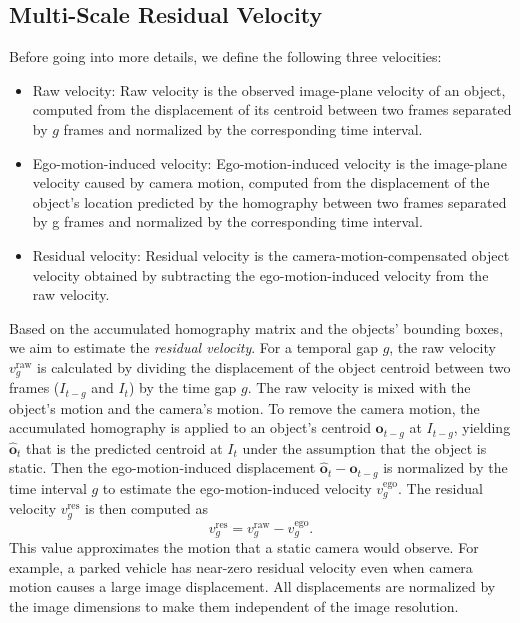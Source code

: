 \documentclass{article}
\begin{document}
\subsection{Multi-Scale Residual Velocity}
\label{sec:residual}
Before going into more details, we define the following three velocities: 
\begin{itemize}
\item Raw velocity: Raw velocity is the observed image-plane velocity of an object, computed from the displacement of its centroid between two frames separated by $g$ frames and normalized by the corresponding time interval. 
\item Ego-motion-induced velocity: Ego-motion-induced velocity is the image-plane velocity caused by camera motion, computed from the displacement of the object's location predicted by the homography between two frames separated by g frames and normalized by the corresponding time interval. 
\item Residual velocity: Residual velocity is the camera-motion-compensated object velocity obtained by subtracting the ego-motion-induced velocity from the raw velocity.
\end{itemize}

Based on the accumulated homography matrix and the objects' bounding boxes, we aim to estimate the \emph{residual velocity}. For a temporal gap $g$, the raw velocity $v^{\mathrm{raw}}_{g}$ is calculated by dividing the displacement of the object centroid between two frames ($I_{t-g}$ and $I_{t}$) by the time gap $g$. The raw velocity is mixed with the object's motion and the camera's motion. To remove the camera motion, the accumulated homography is applied to an object's centroid $\boldsymbol{o}_{t-g}$ at $I_{t-g}$, yielding $\hat{\boldsymbol{o}}_{t}$ that is the predicted centroid at $I_{t}$ under the assumption that the object is static. Then the ego-motion-induced displacement $\hat{\boldsymbol{o}}_{t}-\boldsymbol{o}_{t-g}$ is normalized by the time interval $g$ to estimate the ego-motion-induced velocity $v^{\mathrm{ego}}_{g}$. The residual velocity $v^{\mathrm{res}}_{g}$ is then computed as
\begin{equation}
  v^{\mathrm{res}}_{g} = v^{\mathrm{raw}}_{g} - v^{\mathrm{ego}}_{g}. 
  \label{eq:residual}
\end{equation}
This value approximates the motion that a static camera would observe. For example, a parked vehicle has near-zero residual velocity even when camera motion causes a large image displacement. All displacements are normalized by the image dimensions to make them independent of the image resolution. 
\end{document}
